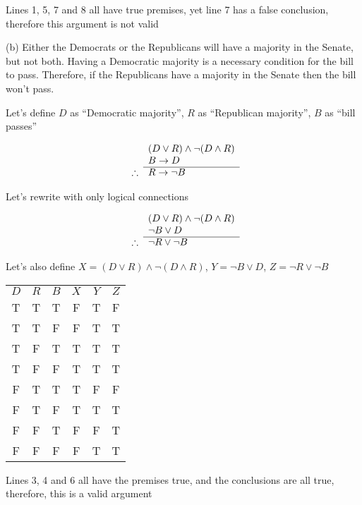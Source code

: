 \documentclass[11pt]{article}
\newcommand{\then}{\rightarrow}
\begin{document}
Lines 1, 5, 7 and 8 all have true premises, yet line 7 has a false conclusion, 
therefore this argument is not valid

\noindent (b) Either the Democrats or the Republicans will have a majority in
the Senate, but not both. Having a Democratic majority is a necessary condition
for the bill to pass. Therefore, if the Republicans have a majority in the 
Senate then the bill won't pass.

Let's define 
$D$ as ``Democratic majority'',
$R$ as ``Republican majority'',
$B$ as ``bill passes''

\[
  \begin{array}{ r l }
               & (D \vee R) \wedge \neg (D \wedge R)\\
               & B \then D \\
    \cline{2-2}
    \therefore & R \then \neg B
  \end{array}
\]

Let's rewrite with only logical connections

\[
  \begin{array}{ r l }
               & (D \vee R) \wedge \neg (D \wedge R)\\
               & \neg B \vee D \\
    \cline{2-2}
    \therefore & \neg R \vee \neg B
  \end{array}
\]

Let's also define 
$X = (D \vee R) \wedge \neg (D \wedge R)$,
$Y = \neg B \vee D$,
$Z = \neg R \vee \neg B$

\begin{center}
\begin{tabular}{ c c c c c c }
$D$ & $R$ & $B$ & $X$ & $Y$ & $Z$\\ 
T & T & T & F & T & F\\  
T & T & F & F & T & T\\
T & F & T & T & T & T\\  
T & F & F & T & T & T\\
F & T & T & T & F & F\\  
F & T & F & T & T & T\\
F & F & T & F & F & T\\  
F & F & F & F & T & T\\
\end{tabular}
\end{center}

Lines 3, 4 and 6 all have the premises true, and the conclusions are all true, 
therefore, this is a valid argument
\end{document}
